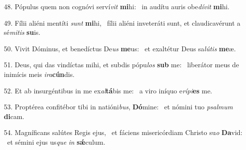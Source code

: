 48. Pópulus quem non cognóvi serví\textit{vit} \textbf{mi}hi: \ast\  in audítu auris obe\textit{dí}\textit{vit} \textbf{mi}hi.\

49. Fílii aliéni mentíti \textit{sunt} \textbf{mi}hi, \ast\  fílii aliéni inveteráti sunt, et claudicavérunt a sé\textit{mi}\textit{tis} \textbf{su}is.\

50. Vivit Dóminus, et benedíctus De\textit{us} \textbf{me}us: \ast\  et exaltétur Deus sa\textit{lú}\textit{tis} \textbf{me}æ.\

51. Deus, qui das vindíctas mihi, et subdis pópu\textit{los} \textbf{sub} me: \ast\  liberátor meus de inimícis meis \textit{i}\textit{ra}\textbf{cún}dis.\

52. Et ab insurgéntibus in me ex\textit{al}\textbf{tá}bis me: \ast\  a viro iníquo e\textit{rí}\textit{pi}\textbf{es} me.\

53. Proptérea confitébor tibi in natióni\textit{bus}, \textbf{Dó}mine: \ast\  et nómini tuo \textit{psal}\textit{mum} \textbf{di}cam.\

54. Magníficans salútes Regis ejus, \dag\  et fáciens misericórdiam Christo su\textit{o} \textbf{Da}vid: \ast\  et sémini ejus us\textit{que} \textit{in} \textbf{sǽ}culum.\

